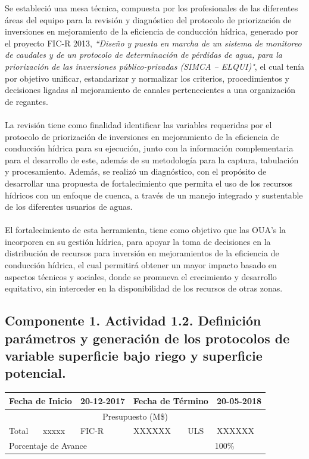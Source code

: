 \documentclass[]{article}
\begin{document}
Se estableció una mesa técnica, compuesta por los profesionales de las diferentes áreas del equipo para la revisión y diagnóstico del protocolo de priorización de inversiones en mejoramiento de la eficiencia de conducción hídrica, generado por el proyecto FIC-R 2013, \textit{``Diseño y puesta en marcha de un sistema de monitoreo de caudales y de un protocolo de determinación de pérdidas de agua, para la priorización de las inversiones público-privadas (SIMCA – ELQUI)"}, el cual tenía por objetivo unificar, estandarizar y normalizar los criterios, procedimientos y decisiones ligadas al mejoramiento de canales pertenecientes a una organización de regantes.\\
\\
La revisión tiene como finalidad identificar las variables requeridas por el protocolo de priorización de inversiones en mejoramiento de la eficiencia de conducción hídrica para su ejecución, junto con la información complementaria para el desarrollo de este, además de su metodología para la captura, tabulación y procesamiento. Además, se realizó un diagnóstico, con el propósito de desarrollar una propuesta de fortalecimiento que permita el uso de los recursos hídricos con un enfoque de cuenca, a través de un manejo integrado y sustentable de los diferentes usuarios de aguas.\\
\\ 
El fortalecimiento de esta herramienta, tiene como objetivo que las OUA's la incorporen en su gestión hídrica, para apoyar la toma de decisiones en la distribución de recursos para inversión en mejoramientos de la eficiencia de conducción hídrica, el cual permitirá obtener un mayor impacto basado en aspectos técnicos y sociales, donde se promueva el crecimiento y desarrollo equitativo, sin interceder en la disponibilidad de los recursos de otras zonas.

\subsection{Componente 1. Actividad 1.2. Definición parámetros y generación de los protocolos de variable superficie bajo riego y superficie potencial.}

\begin{table}[!htb]
\centering
\begin{tabular}{|p{2cm}|p{2cm}|p{2cm}|p{2cm}|p{2cm}|p{2cm}|}
    \hline
    \multicolumn{2}{|l|}{Fecha de Inicio} & 20-12-2017 & \multicolumn{2}{l|}{Fecha de Término} & 20-05-2018\\
    \hline
    \multicolumn{6}{|c|}{Presupuesto (M\$)}\\
    \hline
    Total & xxxxx & FIC-R & XXXXXX & ULS & XXXXXX\\
    \hline
    \multicolumn{4}{|l|}{Porcentaje de Avance} & \multicolumn{2}{c|}{100\%}\\
    \hline
\end{tabular}
\end{table}
\end{document}
